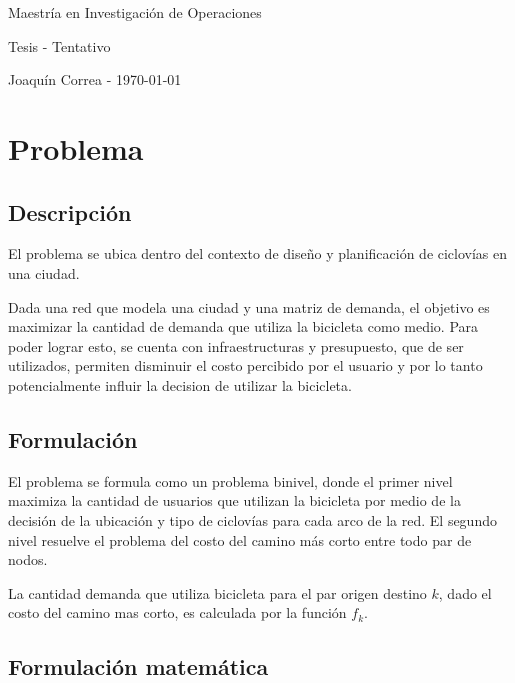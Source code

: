 \documentclass{article}
\begin{document}
  \begin{center}
    {\sc \large Maestría en Investigación de Operaciones}
    
    {\sc \large Tesis - Tentativo}
    \linebreak

    {\rm Joaquín Correa - \today}
  \end{center}

  \section*{Problema}

  \subsection*{Descripción}

  El problema se ubica dentro del contexto de diseño y planificación de ciclovías en una ciudad.

  Dada una red que modela una ciudad y una matriz de demanda, el objetivo es maximizar la cantidad de demanda que utiliza la bicicleta como medio. Para poder lograr esto, se cuenta con infraestructuras y presupuesto, que de ser utilizados, permiten disminuir el costo percibido por el usuario y por lo tanto potencialmente influir la decision de utilizar la bicicleta.

  \subsection*{Formulación}

  El problema se formula como un problema binivel, donde el primer nivel maximiza la cantidad de usuarios que utilizan la bicicleta por medio de la decisión de la ubicación y tipo de ciclovías para cada arco de la red. El segundo nivel resuelve el problema del costo del camino más corto entre todo par de nodos.

  La cantidad demanda que utiliza bicicleta para el par origen destino $k$, dado el costo del camino mas corto, es calculada por la función $f_k$.

  \subsection*{Formulación matemática}
\end{document}
